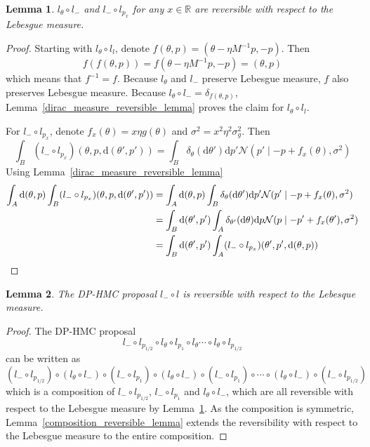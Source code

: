 \documentclass[english,twoside,openright]{HYgraduMLDS}
\newtheorem{lemma}{Lemma}
\newcommand{\R}{\mathbb{R}}
\newcommand{\dx}{\mathrm{d}}
\newcommand{\caln}{{\mathcal{N}}}
\begin{document}
\begin{lemma}\label{leapfrog_step_reversible_lemma}
  \(l_{\theta}\circ l_{-}\) and \(l_{-}\circ l_{p_{x}}\) for any \(x\in \R\)
  are reversible with respect to the Lebesgue measure.
\end{lemma}
\begin{proof}
  Starting with \(l_{\theta}\circ l_{l}\), denote
  \(f(\theta, p) = (\theta - \eta M^{-1}p, -p)\). Then
  \[
    f(f(\theta, p)) = f(\theta - \eta M^{-1}p, -p) = (\theta, p)
  \]
  which means that \(f^{-1} = f\). Because \(l_{\theta}\) and \(l_{-}\) preserve
  Lebesgue measure, \(f\) also preserves Lebesgue measure.
  Because \(l_{\theta}\circ l_{-} = \delta_{f(\theta, p)}\),
  Lemma~\ref{dirac_measure_reversible_lemma} proves the claim for
  \(l_{\theta}\circ l_{l}\).

  For \(l_{-}\circ l_{p_{x}}\), denote \(f_{x}(\theta) = x\eta g(\theta)\) and
  \(\sigma^{2} = x^{2}\eta^{2}\sigma_{g}^{2}\). Then
  \[
    \int_{B}(l_{-}\circ l_{p_{x}})(\theta, p, \dx(\theta', p')) =
    \int_{B}\delta_{\theta}(\dx \theta')\dx p'\caln(p'\mid -p + f_{x}(\theta), \sigma^{2})
  \]
  Using Lemma~\ref{dirac_measure_reversible_lemma}
	\begin{align*}
    \int_{A}\dx(\theta, p)\int_{B}(l_{-}\circ l_{p_{x}})(\theta, p, \dx(\theta', p'))
    &= \int_{A}\dx(\theta, p)\int_{B}\delta_{\theta}(\dx \theta')\dx p'
      \caln(p'\mid -p + f_{x}(\theta), \sigma^{2})
    \\&= \int_{B}\dx(\theta', p')\int_{A}\delta_{\theta'}(\dx \theta)\dx p
    \caln(p\mid -p' + f_{x}(\theta'), \sigma^{2})
    \\&= \int_{B}\dx(\theta', p')\int_{A}(l_{-}\circ l_{p_{x}})(\theta', p', \dx(\theta, p))
    \qedhere
  \end{align*}
\end{proof}

\begin{lemma}\label{leapfrog_reversibility_lemma}
	The DP-HMC proposal \(l_{-} \circ l\) is reversible with respect
  to the Lebesque measure.
\end{lemma}
\begin{proof}
  The DP-HMC proposal
  \[
    l_{-}\circ l_{p_{1/2}}\circ l_{\theta}\circ l_{p_{1}}\circ l_{\theta}
    \dotsb \circ l_{\theta}\circ l_{p_{1/2}}
  \]
  can be written as
  \[
    (l_{-}\circ l_{p_{1/2}})\circ (l_{\theta} \circ l_{-})\circ (l_{-}\circ l_{p_{1}})
    \circ (l_{\theta} \circ l_{-}) \circ (l_{-} \circ l_{p_{1}})\circ
    \dotsb \circ (l_{\theta}\circ l_{-})\circ (l_{-}\circ l_{p_{1/2}})
  \]
  which is a composition of \(l_{-}\circ l_{p_{1/2}}\), \(l_{-}\circ l_{p_{1}}\)
  and \(l_{\theta}\circ l_{-}\), which are all reversible with respect to the
  Lebesgue measure by Lemma~\ref{leapfrog_step_reversible_lemma}.
  As the composition is symmetric,
  Lemma~\ref{composition_reversible_lemma} extends the reversibility
  with respect to the Lebesgue measure to the entire composition.
\end{proof}
\end{document}
